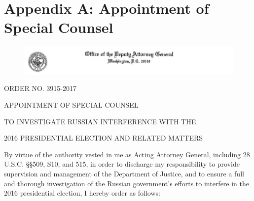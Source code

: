 \section{Appendix A: Appointment of Special Counsel}

\newpage

\begin{figure}[ht]
    \vspace{-20pt}
    \begin{center}
        \includegraphics[width=8.25in]{images/appendix-a-header.png}%
    \end{center}
    \vspace{-20pt}
\end{figure}

\begin{center}
ORDER NO. 3915-2017

APPOINTMENT OF SPECIAL COUNSEL

TO INVESTIGATE RUSSIAN INTERFERENCE WITH THE

2016 PRESIDENTIAL ELECTION AND RELATED MATTERS
\end{center}

By virtue of the authority vested in me as Acting Attorney General, including 28 U.S.C. \S\S 509, S10, and 515, in order to discharge my responsibility to provide supervision and management of the Department of Justice, and to ensure a full and thorough investigation of the Russian government's efforts to interfere in the 2016 presidential election, I hereby order as follows:

